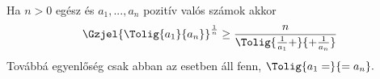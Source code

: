    Ha $n>0$ egész és $a_{1},...,a_{n}$ pozitív valós számok akkor
   $$
   \Gzjel{\Tolig{a_{1}}{a_{n}}}^{\frac{1}{n}} \ge 
   \frac{n}{\Tolig{\frac{1}{a_{1}}+}{+\frac{1}{a_{n}}}} 
   $$
   Továbbá egyenlőség csak abban az esetben áll fenn, $\Tolig{a_{1}=}{=a_{n}}.$
